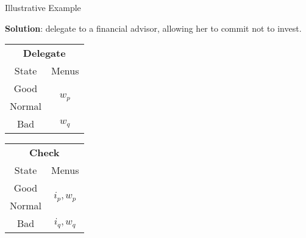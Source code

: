 \documentclass[usenames,dvipsnames,aspectratio=169,11pt, envcountsect, handout]{beamer}
\begin{document}
\begin{frame}[noframenumbering]{Illustrative Example}

	\textbf{Solution}: delegate to a financial advisor, allowing her to commit not to invest. \pause

	\vfill

	\begin{table}[H]
		\centering
		\begin{minipage}{0.29\textwidth}
			\centering
			\begin{tabular}{c | c}
				\multicolumn{2}{c}{\textbf{Delegate}}                           \\
				State                & Menus                                    \\
				\hline
				{\color{blue}Good}   & \multirow{2}{*}{{\color{blue}\( w_p \)}} \\
				{\color{blue}Normal} &                                          \\
				Bad                  & \( w_q \)                                \\
			\end{tabular}
			\vspace{0.5cm} %
		\end{minipage}\hspace{0.5cm} %
		\begin{minipage}{0.29\textwidth}
			\centering
			\begin{tabular}{c | c}
				\multicolumn{2}{c}{\textbf{Check}}                                     \\
				State                & Menus                                           \\
				\hline
				{\color{blue}Good}   & \multirow{2}{*}{{\color{blue}\( i_{p}, w_p \)}} \\
				{\color{blue}Normal} &                                                 \\
				Bad                  & \(  i_{q}, w_q \)                               \\
			\end{tabular}
			\vspace{0.5cm} %
		\end{minipage}\hspace{0.5cm} %
		\begin{minipage}{0.29\textwidth}

\end{minipage}
\end{table}
\end{frame}
\end{document}
